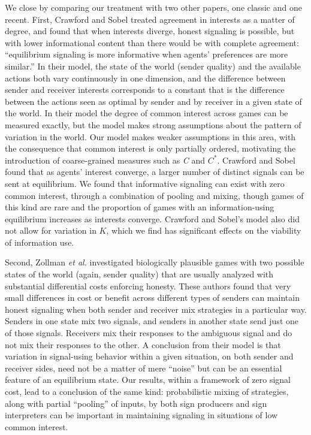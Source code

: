 \documentclass[10pt]{article}
\begin{document}
We close by comparing our treatment with two other papers, one classic
and one recent. First, Crawford and Sobel \cite{Crawford1982} treated agreement in
interests as a matter of degree, and found that when interests diverge,
honest signaling is possible, but with lower informational content than
there would be with complete agreement: ``equilibrium signaling is more
informative when agents' preferences are more similar.'' In their model,
the state of the world (sender quality) and the available actions both
vary continuously in one dimension, and the difference between sender
and receiver interests corresponds to a constant that is the difference
between the actions seen as optimal by sender and by receiver in a given
state of the world. In their model the degree of common interest across
games can be measured exactly, but the model makes strong assumptions
about the pattern of variation in the world. Our model makes weaker
assumptions in this area, with the consequence that common interest is
only partially ordered, motivating the introduction of coarse-grained
measures such as \emph{C} and $C^*$. Crawford and Sobel found that as
agents' interest converge, a larger number of distinct signals can be
sent at equilibrium. We found that informative signaling can exist with
zero common interest, through a combination of pooling and mixing,
though games of this kind are rare and the proportion of games with an
information-using equilibrium increases as interests converge. Crawford
and Sobel's model also did not allow for variation in $K$, which we find
has significant effects on the viability of information use.

Second, Zollman \emph{et al.} \cite{Zollman2013} investigated biologically plausible games
with two possible states of the world (again, sender quality) that are
usually analyzed with substantial differential costs enforcing honesty.
These authors found that very small differences in cost or benefit
across different types of senders can maintain honest signaling when
both sender and receiver mix strategies in a particular way. Senders in
one state mix two signals, and senders in another state send just one of
those signals. Receivers mix their responses to the ambiguous signal and
do not mix their responses to the other. A conclusion from their model
is that variation in signal-using behavior within a given situation, on
both sender and receiver sides, need not be a matter of mere ``noise''
but can be an essential feature of an equilibrium state. Our results,
within a framework of zero signal cost, lead to a conclusion of the same
kind: probabilistic mixing of strategies, along with partial ``pooling''
of inputs, by both sign producers and sign interpreters can be important
in maintaining signaling in situations of low common interest.
\end{document}
